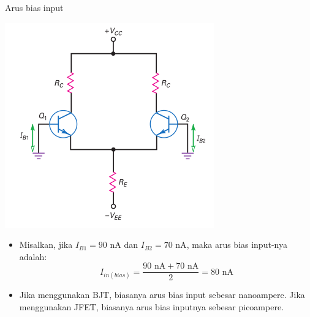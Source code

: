 \documentclass[aspectratio=169]{beamer}
\begin{document}
\begin{frame}{Arus bias input}
	\begin{multicols}{2}
		\begin{center}
			\includegraphics[height=0.7\textheight]{gambar/01.diff-amp/01.different_base_currents}
		\end{center}
		\columnbreak
		\begin{itemize}
			\item Misalkan, jika $ I_{B1} = 90 \text{ nA} $ dan $ I_{B2} = 70 \text{ nA} $, maka arus bias input-nya adalah:
			\[ I_{in(bias)} = \frac{ 90 \text{ nA} + 70 \text{ nA} }{2} = 80 \text{ nA}\]
			\item Jika menggunakan BJT, biasanya arus bias input sebesar nanoampere. Jika menggunakan JFET, biasanya arus bias inputnya sebesar picoampere.
		\end{itemize}
	\end{multicols}
\end{frame}
\end{document}
